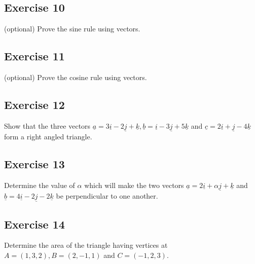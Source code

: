 \documentclass[
  11pt,
  oneside]{book}
\newcommand{\slide}{}
\theoremstyle{definition}
\theoremstyle{definition}
\theoremstyle{definition}
\theoremstyle{definition}
\theoremstyle{remark}
\begin{document}
\slide

\subsection*{Exercise 10}\label{exercise-10-1}

(optional) Prove the sine rule using vectors.

\slide

\subsection*{Exercise 11}\label{exercise-11-1}

(optional) Prove the cosine rule using vectors.

\slide

\subsection*{Exercise 12}\label{exercise-12}

Show that the three vectors \(\underline{a} = 3\underline{i} - 2\underline{j} + \underline{k}, \underline{b} = \underline{i} - 3\underline{j} + 5\underline{k}\) and \(\underline{c}= 2\underline{i} + \underline{j} - 4\underline{k}\) form a right angled triangle.

\slide

\subsection*{Exercise 13}\label{exercise-13}

Determine the value of \(\alpha\) which will make the two vectors \(\underline{a} = 2\underline{i} + \alpha\underline{j} + \underline{k}\) and \(\underline{b} = 4\underline{i} - 2\underline{j} - 2\underline{k}\) be perpendicular to one another.

\slide

\subsection*{Exercise 14}\label{exercise-14}

Determine the area of the triangle having vertices at \(A=(1,3,2), B=(2, -1,1)\) and \(C=(-1,2,3)\).
\end{document}
